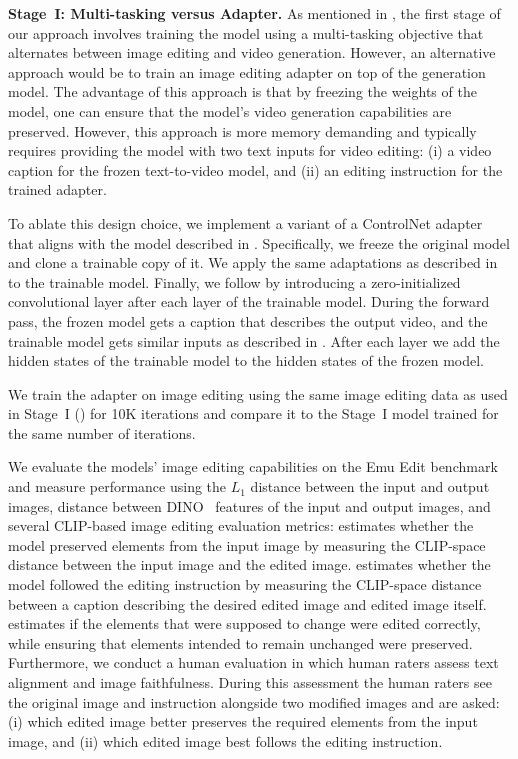 \textbf{Stage~I: Multi-tasking versus Adapter.}
As mentioned in , the first stage of our approach involves training the model using a multi-tasking objective that alternates between image editing and video generation.
However, an alternative approach would be to train an image editing adapter on top of the \textToV generation model.
The advantage of this approach is that by freezing the weights of the \TextToV model, one can ensure that the model's video generation capabilities are preserved.
However, this approach is more memory demanding and typically requires providing the model with two text inputs for video editing: (i) a video caption for the frozen text-to-video model, and (ii) an editing instruction for the trained adapter.

To ablate this design choice, we implement a variant of a ControlNet adapter~\citep{zhang2023adding} that aligns with the model described in .
Specifically, we freeze the original \textToV model and clone a trainable copy of it.
We apply the same adaptations as described in  to the trainable model.
Finally, we follow \citep{zhang2023adding} by introducing a zero-initialized convolutional layer after each layer of the trainable model.
During the forward pass, the frozen model gets a caption that describes the output video, and the trainable model gets similar inputs as described in .
After each layer we add the hidden states of the trainable model to the hidden states of the frozen model.

We train the adapter on image editing using the same image editing data as used in Stage~I () for 10K iterations and compare it to the Stage~I model trained for the same number of iterations.

We evaluate the models' image editing capabilities on the Emu Edit benchmark~\citep{emuedit} and measure performance using the $L_1$ distance between the input and output images, distance between DINO~\citep{groundingdino} features of the input and output images, and several CLIP-based image editing evaluation metrics:
 estimates whether the model preserved elements from the input image by measuring the CLIP-space distance between the input image and the edited image.
 estimates whether the model followed the editing instruction by measuring the CLIP-space distance between a caption describing the desired edited image and edited image itself.
 estimates if the elements that were supposed to change were edited correctly, while ensuring that elements intended to remain unchanged were preserved.
Furthermore, we conduct a human evaluation in which human raters assess text alignment and image faithfulness.
During this assessment the human raters see the original image and instruction alongside two modified images and are asked: (i) which edited image better preserves the required elements from the input image, and (ii) which edited image best follows the editing instruction.

